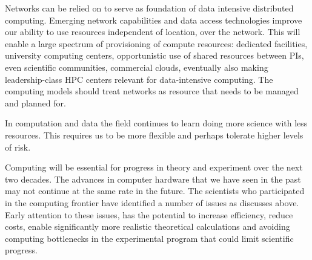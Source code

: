 Networks can be relied on to serve as foundation of data intensive distributed computing. Emerging network capabilities and data access technologies improve our ability to use resources independent of location, over the network. This will enable a large spectrum of provisioning of compute resources: dedicated facilities, university computing centers, opportunistic use of shared resources between PIs, even scientific communities, commercial clouds, eventually also making leadership-class HPC centers relevant for data-intensive computing. The computing models should treat networks as resource that needs to be managed and planned for. 

In computation and data the field continues to learn doing more science with less resources. This requires us to be more flexible and perhaps tolerate higher levels of risk.

Computing will be essential for progress in theory and experiment over the next two decades.  The advances in computer hardware that we have seen in the past may not continue at the same rate in the future.  The scientists who participated in the computing frontier have identified a number of issues as discusses above. Early attention to these issues, has the potential to increase efficiency, reduce costs, enable significantly more realistic theoretical calculations and avoiding computing bottlenecks in the experimental program that could limit scientific progress.

